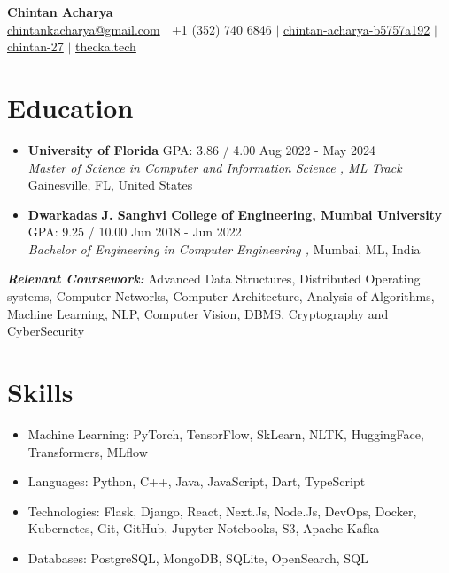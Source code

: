 \documentclass[a4paper,10pt]{article}
\begin{document}
\pagestyle{empty}

\begin{center}
    \textbf{\LARGE Chintan Acharya} \\
    \vspace{7pt} 
    \href{mailto:chintankacharya@gmail.com}{chintankacharya@gmail.com} $\vert$ +1 (352) 740 6846 $\vert$ \href{https://linkedin.com/in/chintan-acharya-b5757a192}{\faLinkedin  { } chintan-acharya-b5757a192} $\vert$ \href{https://github.com/chintan-27}{\faGithub { } chintan-27} $\vert$ \href{https://thecka.tech}{thecka.tech}

\end{center}

\vspace{-20pt}
\section*{Education}
\vspace{-5pt}

\begin{itemize}
    \item \textbf{University of Florida} GPA: 3.86 / 4.00  \hfill Aug 2022 - May 2024 \\
\textit{Master of Science in Computer and Information Science , ML Track} \hfill Gainesville, FL, United States
\vspace{5pt}
\item \textbf{Dwarkadas J. Sanghvi College of Engineering, Mumbai University} GPA: 9.25 / 10.00  \hfill Jun 2018 - Jun 2022 \\
\textit{Bachelor of Engineering in Computer Engineering , } \hfill Mumbai, ML, India
 \\
\end{itemize}
\vspace{-5pt}
    \textit{\textbf{Relevant Coursework:}} Advanced Data Structures, Distributed Operating systems, Computer Networks, Computer Architecture, Analysis of Algorithms, Machine Learning, NLP, Computer Vision, DBMS, Cryptography and CyberSecurity

\vspace{-10pt}
\section*{Skills}
\vspace{-5pt}
\begin{itemize}
   \item Machine Learning: PyTorch, TensorFlow, SkLearn, NLTK, HuggingFace, Transformers, MLflow  
\item Languages: Python, C++, Java, JavaScript, Dart, TypeScript  
\item Technologies: Flask, Django, React, Next.Js, Node.Js, DevOps, Docker, Kubernetes, Git, GitHub, Jupyter Notebooks, S3, Apache Kafka  
\item Databases: PostgreSQL, MongoDB, SQLite, OpenSearch, SQL
\end{itemize}
\end{document}
